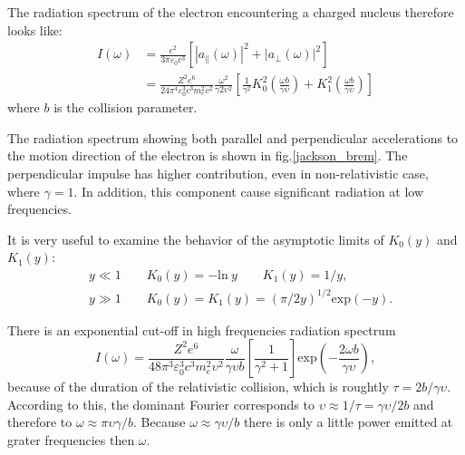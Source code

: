 \documentclass[oneside,a4paper,11pt]{report}
\begin{document}
The radiation spectrum of the electron encountering a charged nucleus therefore looks like: 
\begin{equation}
 \label{rad_spec_brem}
\begin{split}
I(\omega) &= \frac{e^2}{3\pi \varepsilon_0 c^3}\left [ \left | a_\parallel (\omega) \right |^2 + \left | a_\perp (\omega) \right |^2 \right ] \\
&= \frac{Z^2e^6}{24\pi^4 \varepsilon_0^3 c^3 m_e^2 v^2} \frac{\omega^2}{\gamma2 \upsilon^2}\left [ \frac{1}{\gamma^2}K_0^2\left ( \frac{\omega b}{\gamma \upsilon} \right ) + K_1^2 \left ( \frac{\omega b}{\gamma \upsilon} \right ) \right ] 
\end{split}
\end{equation}
where $b$ is the collision parameter. 

The radiation spectrum showing both parallel and perpendicular accelerations to the motion 
direction of the electron is shown in fig.\ref{jackson_brem}. The perpendicular impulse 
has higher contribution, even in non-relativistic case, where $\gamma = 1$.  In addition, 
this component cause significant radiation at low frequencies.   

It is very useful to examine the behavior of the asymptotic limits of $K_0(y)$ and $K_1(y)$: 
\begin{equation}
 \label{examine_k}
\begin{split}
&y \ll 1 \qquad K_0(y) = -\mathrm{ln} \: y \qquad K_1(y) = 1/y , \\
&y \gg 1 \qquad  K_0(y) =  K_1(y) = (\pi/2y)^{1/2} \mathrm{exp}(-y).    
\end{split}
\end{equation}

There is an exponential cut-off in high frequencies radiation spectrum
\begin{equation}
\label{high_f}
I(\omega) = \frac{Z^2 e^6}{48 \pi^3 \varepsilon_0^3 c^3 m_e^2 \upsilon^2 } \frac{\omega}{\gamma \upsilon b} \left [ \frac{1}{\gamma^2 +1} \right ] \mathrm{exp}\left ( - \frac{2 \omega b}{\gamma \upsilon} \right ), 
\end{equation}
because of the duration of the relativistic collision, 
which is roughtly $\tau = 2b / \gamma \upsilon$. According to this, the dominant Fourier corresponds to 
$\upsilon \approx 1/ \tau = \gamma \upsilon / 2b$ and therefore to $\omega \approx \pi \upsilon \gamma / b$. 
Because $\omega \approx \gamma \upsilon / b$ there is only a little power emitted at grater frequencies 
then $\omega$. 
\end{document}
